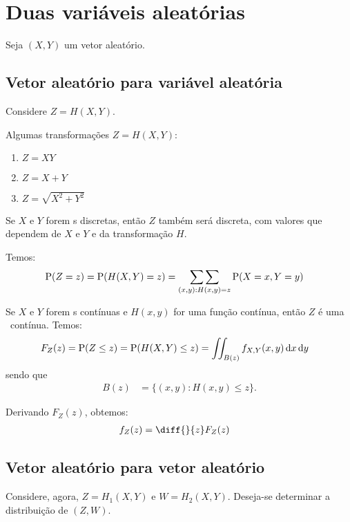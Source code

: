 \section{Duas variáveis aleatórias}

Seja $(X, Y)$ um vetor aleatório.

\subsection{Vetor aleatório para variável aleatória}
Considere $Z = H(X, Y)$.

\begin{example}
    Algumas transformações $Z = H(X, Y)$:
    \begin{enumerate}[label=(\roman*)]
        \item $Z = XY$
        \item $Z = X + Y$
        \item $Z = \sqrt{X^2 + Y^2}$
    \end{enumerate}
\end{example}

Se $X$ e $Y$ forem \va s discretas, então $Z$ também
será discreta, com valores que dependem de $X$ e $Y$
e da transformação $H$.

Temos:
\begin{align}
    \operatorname{P}(Z = z) = \operatorname{P}(H(X, Y) = z)
    &= \underset{(x, y) : H(x, y) = z}{\sum\sum}
        \operatorname{P}(X = x, Y = y)
\end{align}

Se $X$ e $Y$ forem \va s contínuas e $H(x, y)$ for uma função
contínua, então $Z$ é uma \va\ contínua. Temos:
\begin{align}
    F_Z(z) = \operatorname{P}(Z \le z) = \operatorname{P}(H(X, Y) \le z)
    &= \iint_{B(z)} f_{X,Y}(x, y) \,\mathrm{d} x \,\mathrm{d} y
\end{align}
sendo que
\begin{align*}
    B(z) &= \{(x, y) : H(x, y) \le z \}.
\end{align*}

Derivando $F_Z(z)$, obtemos:
\begin{align*}
    f_Z(z) &= \diff{}{z} F_Z(z)
\end{align*}

\subsection{Vetor aleatório para vetor aleatório}
Considere, agora, $Z = H_1(X, Y)$ e $W = H_2(X, Y)$.
Deseja-se determinar a distribuição de $(Z, W)$.

